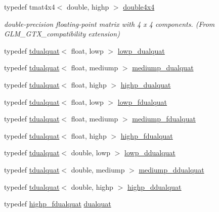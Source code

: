 \begin{DoxyCompactItemize}
typedef tmat4x4$<$ double, highp $>$ \hyperlink{group__gtx__compatibility_ga83ac0f28025f5e999b03094400fbddcb}{double4x4}
\begin{DoxyCompactList}\small\item\em double-\/precision floating-\/point matrix with 4 x 4 components. (From G\+L\+M\+\_\+\+G\+T\+X\+\_\+compatibility extension) \end{DoxyCompactList}\item 
typedef \hyperlink{structglm_1_1tdualquat}{tdualquat}$<$ float, lowp $>$ \hyperlink{group__gtx__dual__quaternion_ga4888200ed911e4887c2423fed74ad362}{lowp\+\_\+dualquat}
\item 
typedef \hyperlink{structglm_1_1tdualquat}{tdualquat}$<$ float, mediump $>$ \hyperlink{group__gtx__dual__quaternion_gaa88fe93eb823d1aba8d6df8028572cb5}{mediump\+\_\+dualquat}
\item 
typedef \hyperlink{structglm_1_1tdualquat}{tdualquat}$<$ float, highp $>$ \hyperlink{group__gtx__dual__quaternion_ga98557c3577757f2ced8f35b1de7fa234}{highp\+\_\+dualquat}
\item 
typedef \hyperlink{structglm_1_1tdualquat}{tdualquat}$<$ float, lowp $>$ \hyperlink{group__gtx__dual__quaternion_ga797f6d2679ab6773c1f057b97bf95111}{lowp\+\_\+fdualquat}
\item 
typedef \hyperlink{structglm_1_1tdualquat}{tdualquat}$<$ float, mediump $>$ \hyperlink{group__gtx__dual__quaternion_ga93e9def86ffeedd48d9c79a6afacfa6c}{mediump\+\_\+fdualquat}
\item 
typedef \hyperlink{structglm_1_1tdualquat}{tdualquat}$<$ float, highp $>$ \hyperlink{group__gtx__dual__quaternion_ga8c46d61c38b2b6d9c5091c667dd20fe8}{highp\+\_\+fdualquat}
\item 
typedef \hyperlink{structglm_1_1tdualquat}{tdualquat}$<$ double, lowp $>$ \hyperlink{group__gtx__dual__quaternion_ga361a2ea6cce1446a8ab7e7803156c16c}{lowp\+\_\+ddualquat}
\item 
typedef \hyperlink{structglm_1_1tdualquat}{tdualquat}$<$ double, mediump $>$ \hyperlink{group__gtx__dual__quaternion_ga5727116ab20b2a1d40387766d723dd6c}{mediump\+\_\+ddualquat}
\item 
typedef \hyperlink{structglm_1_1tdualquat}{tdualquat}$<$ double, highp $>$ \hyperlink{group__gtx__dual__quaternion_ga83e4c5d27c8b0a264a3f3aed24f3f84e}{highp\+\_\+ddualquat}
\item 
typedef \hyperlink{group__gtx__dual__quaternion_ga8c46d61c38b2b6d9c5091c667dd20fe8}{highp\+\_\+fdualquat} \hyperlink{group__gtx__dual__quaternion_ga2f6227b5f9dc08a2e7682065a84b3aa9}{dualquat}

\end{DoxyCompactItemize}
